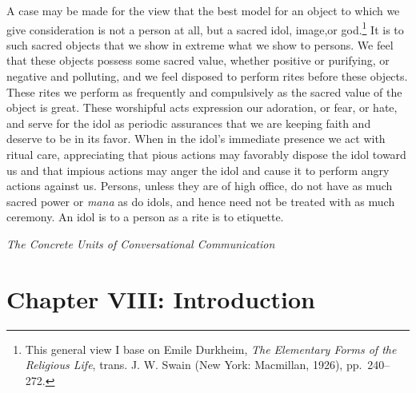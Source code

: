 \documentclass[twoside,symmetric,nobib,justified]{tufte-book}
\let\oldchapter\chapter
\def\chapter{%
  \setcounter{footnote}{0}%
  \oldchapter
}
\begin{document}
A case may be made for the view that the best model for an object to
which we give consideration is not a person at all, but a sacred idol,
image,\newpage\noindent or god.\footnote{This general view I base on Emile Durkheim,
  \emph{The Elementary Forms of the Religious Life}, trans. J. W. Swain
  (New York: Macmillan, 1926), pp.~240--272.} It is to such sacred
objects that we show in extreme what we show to persons. We feel that
these objects possess some sacred value, whether positive or purifying,
or negative and polluting, and we feel disposed to perform rites before
these objects. These rites we perform as frequently and compulsively as
the sacred value of the object is great. These worshipful acts
expression our adoration, or fear, or hate, and serve for the idol as
periodic assurances that we are keeping faith and deserve to be in its
favor. When in the idol's immediate presence we act with ritual care,
appreciating that pious actions may favorably dispose the idol toward us
and that impious actions may anger the idol and cause it to perform
angry actions against us. Persons, unless they are of high office, do
not have as much sacred power or \emph{mana} as do idols, and hence need
not be treated with as much ceremony. An idol is to a person as a rite
is to etiquette.

\newpage
\thispagestyle{plain} %
\mbox{}

\newpage
\thispagestyle{empty}
\begin{fullwidth}

\begin{center}
\vspace*{3in}

{\fontsize{35}{24}\selectfont{Part Four}\par}

\vspace{1in}

{\fontsize{35}{24}\selectfont\textit{The Concrete Units of Conversational Communication}\par}

\end{center}

\end{fullwidth}

\chapter[CHAPTER VIII: INTRODUCTION]{Chapter VIII: Introduction}
\label{ch:Chapter VIII: Introduction}
\end{document}
